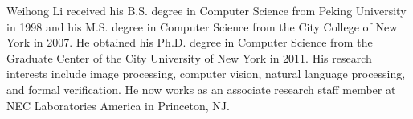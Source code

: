 \documentclass[10pt,journal,cspaper,compsoc]{IEEEtran}
\begin{document}
\ifCLASSOPTIONcaptionsoff
  \newpage
\fi





% 

\begin{IEEEbiography}{Weihong Li}
received his B.S. degree in Computer Science from Peking University in 1998
and his M.S. degree in Computer Science from the City College of New York in 2007. 
He obtained his Ph.D. degree in Computer Science from the Graduate Center of
the City University of New York in 2011. 
His research interests include image processing, computer vision, 
natural language processing, and formal verification.
He now works as an associate research staff member at 
NEC Laboratories America in Princeton, NJ.

\end{IEEEbiography}
\end{document}
